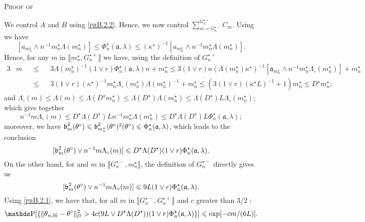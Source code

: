 \begin{pro}{\textsc{Proof of } \\}
\medskip

We control $A$ and $B$ using \textsc{\cref{prB.2.2}}.
Hence, we now control $\sum\nolimits_{m = G_{n}^{\star-}}^{G_{n}^{\star+}} C_{m}$.
Using  we have
\[[a_{m_{n}^{\star}} \wedge n^{-1} m_{n}^{\star} \Lambda(m_{n}^{\star}) ] \leq \Phi_{n}^{\star}(\mathfrak{a}, \lambda) \leq  (\kappa^{\star})^{-1}[a_{m_{n}^{\star}} \wedge n^{-1} m_{n}^{\star} \Lambda(m_{n}^{\star})].\]
Hence, for any $m$ in $\llbracket m_{n}^{\star}, G_{n}^{\star+} \rrbracket$ we have, using the definition of $G_{n}^{\star +}$
\begin{alignat*}{3}
& m && \leq && 3 \Lambda(m_{n}^{\star})^{-1} (1 \vee r) \Phi_{n}^{\star}(\mathfrak{a}, \lambda) n + m_{n}^{\star} \leq 3 (1 \vee r) n (\Lambda(m_{n}^{\star}) \kappa^{\star})^{-1} [\mathfrak{a}_{m_{n}^{\star}} \wedge n^{-1} m_{n}^{\star} \Lambda_{\circ}(m_{n}^{\star})] + m_{n}^{\star}\\
& && \leq && 3 (1 \vee r)(\kappa^{\star})^{-1} m_{n}^{\star} \Lambda_{\circ}(m_{n}^{\star}) \Lambda(m_{n}^{\star})^{-1} + m_{n}^{\star} \leq ( 3 (1 \vee r)(\kappa^{\star} L)^{-1} + 1) m_{n}^{\star} \leq D^{\star} m_{n}^{\star};
\end{alignat*}
and $\Lambda_{\circ}(m) \leq \Lambda(m) \leq \Lambda(D^{\star} m_{n}^{\star}) \leq \Lambda(D^{\star}) \Lambda(m_{n}^{\star}) \leq \Lambda(D^{\star}) L \Lambda_{\circ}(m_{n}^{\star})$;
which give together
\[n^{-1} m \Lambda_{\circ}(m) \leq D^{\star} \Lambda(D^{\star}) L n^{-1} m_{n}^{\star} \Lambda(m_{n}^{\star}) \leq D^{\star} \Lambda(D^{\star}) L \Phi_{n}^{\star}(\mathfrak{a}, \lambda);\]
moreover, we have $\operatorname{\mathfrak{b}}_{m}^{2}(\theta^{\circ}) \leqslant \operatorname{\mathfrak{b}}_{m_{n}^{\star}}^{2}(\theta^{\circ})^{2}(\theta^{\circ}) \leqslant \Phi_{n}^{\star}(\mathfrak{a}, \lambda)$, which leads to the conclusion
\[[\operatorname{\mathfrak{b}}_{m}^{2}(\theta^{\circ}) \vee n^{-1} m \Lambda_{\circ}(m) ] \leqslant D^{\star} \Lambda(D^{\star}) ( 1 \vee r) \Phi_{n}^{\star}(\mathfrak{a}, \lambda).\]
On the other hand, for and $m$ in $\llbracket G_{n}^{\star -}, m_{n}^{\star} \rrbracket$, the definition of $G_{n}^{\star -}$ directly gives us
\[[\operatorname{\mathfrak{b}}_{m}^{2}(\theta^{\circ}) \vee n^{-1} m \Lambda_{\circ}(m) ] \leqslant 9 L (1 \vee r) \Phi_{n}^{\star}(\mathfrak{a}, \lambda).\]
Using \textsc{\cref{prB.2.1}}, we have that, for all $m$ in $\llbracket G_{n}^{\star-}, G_{n}^{\star+} \rrbracket$ and $c$ greater than $3/2$ :
\[\P[\{\Vert \theta_{n, \overline{m}} - \theta^{\circ}\Vert_{l^{2}}^{2} > 4c (9 L \vee D^{\star} \Lambda(D^{\star})) (1 \vee r) \Phi_{n}^{\star}(\mathfrak{a}, \lambda)\}] \leq \exp[-c m/(6 L)].\]

\end{pro}
